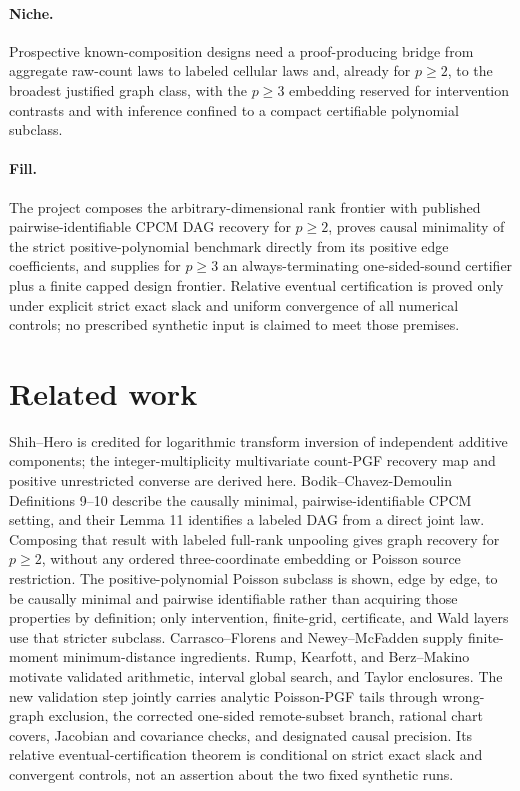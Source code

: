 \documentclass{article}
\begin{document}
\paragraph{Niche.} Prospective known-composition designs need a proof-producing bridge from aggregate raw-count laws to labeled cellular laws and, already for \(p\geq2\), to the broadest justified graph class, with the \(p\geq3\) embedding reserved for intervention contrasts and with inference confined to a compact certifiable polynomial subclass.

\paragraph{Fill.} The project composes the arbitrary-dimensional rank frontier with published pairwise-identifiable CPCM DAG recovery for \(p\geq2\), proves causal minimality of the strict positive-polynomial benchmark directly from its positive edge coefficients, and supplies for \(p\geq3\) an always-terminating one-sided-sound certifier plus a finite capped design frontier. Relative eventual certification is proved only under explicit strict exact slack and uniform convergence of all numerical controls; no prescribed synthetic input is claimed to meet those premises.

\section{Related work}

Shih--Hero is credited for logarithmic transform inversion of independent additive components; the integer-multiplicity multivariate count-PGF recovery map and positive unrestricted converse are derived here. Bodik--Chavez-Demoulin Definitions 9--10 describe the causally minimal, pairwise-identifiable CPCM setting, and their Lemma 11 identifies a labeled DAG from a direct joint law. Composing that result with labeled full-rank unpooling gives graph recovery for \(p\geq2\), without any ordered three-coordinate embedding or Poisson source restriction. The positive-polynomial Poisson subclass is shown, edge by edge, to be causally minimal and pairwise identifiable rather than acquiring those properties by definition; only intervention, finite-grid, certificate, and Wald layers use that stricter subclass. Carrasco--Florens and Newey--McFadden supply finite-moment minimum-distance ingredients. Rump, Kearfott, and Berz--Makino motivate validated arithmetic, interval global search, and Taylor enclosures. The new validation step jointly carries analytic Poisson-PGF tails through wrong-graph exclusion, the corrected one-sided remote-subset branch, rational chart covers, Jacobian and covariance checks, and designated causal precision. Its relative eventual-certification theorem is conditional on strict exact slack and convergent controls, not an assertion about the two fixed synthetic runs.
\end{document}

